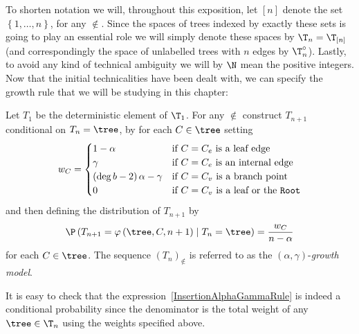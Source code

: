 To shorten notation we will, throughout this exposition, let $[n]$ denote the set $\left\{ 1, \ldots, n \right\}$, for any $\nin$.
Since the spaces of trees indexed by exactly these sets is going to play an essential role we will simply denote these spaces by $\T_n = \T_{[n]}$ (and correspondingly the space of unlabelled trees with $n$ edges by $\T_n^\circ$).
Lastly, to avoid any kind of technical ambiguity we will by $\N$ mean the positive integers. \\

Now that the initial technicalities have been dealt with, we can specify the growth rule that we will be studying in this chapter:
%
\begin{defi}\label{alphagamma_gr}
  Let $T_1$ be the deterministic element of $\T_1$.
  For any $\nin$ construct $T_{n+1}$ conditional on $T_n = \tree$, by for each $C \in \tree$ setting
  \begin{align}
    w_C
    = 
    \begin{cases}
      1 - \alpha & \text{if $C = C_e$ is a leaf edge} \\
      \gamma & \text{if $C = C_e$ is an internal edge} \\
      \left( \deg b - 2 \right) \alpha - \gamma & \text{if $C = C_v$ is a branch point} \\
      0 & \text{if $C = C_v$ is a leaf or the \texttt{Root}}
    \end{cases}
  \end{align}
  and then defining the distribution of $T_{n+1}$ by
  \begin{align}
    \P \left( T_{n+1} = \varphi \left( \tree, C, n+1 \right) \mid T_n = \tree \right)
    = \frac{w_C}{n - \alpha} 
    \label{InsertionAlphaGammaRule}
  \end{align}
  for each $C \in \tree$.
  The sequence ${\left( T_n \right)}_\nin$ is referred to as the $(\alpha, \gamma)$-\textit{growth model}.
\end{defi}
%
It is easy to check that the expression~\eqref{InsertionAlphaGammaRule} is indeed a conditional probability since the denominator is the total weight of any $\tree \in \T_n$ using the weights specified above.

